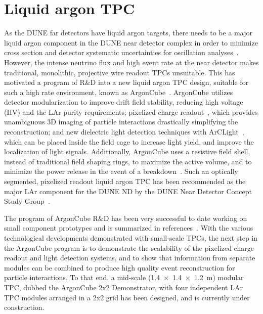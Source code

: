\section{Liquid argon TPC}
\label{sec:exsum-nd-lartpc}


As the DUNE far detectors have liquid argon targets, there needs to be a major liquid argon component in the DUNE near detector complex in order to minimize cross section and detector systematic uncertainties for oscillation analyses~\cite{Acciarri:2016crz, Acciarri:2015uup}. However, the intense neutrino flux and high event rate at the near detector makes traditional, monolithic, projective wire readout TPCs unsuitable.  This has motivated a program of R\&D into a new liquid argon TPC design, suitable for such a high rate environment, known as ArgonCube~\cite{argoncube_loi}. ArgonCube utilizes detector modularization to improve drift field stability, reducing high voltage (HV) and the LAr purity requirements; pixelized charge readout~\cite{Asaadi:2018oxk, larpix}, which provides unambiguous 3D imaging of particle interactions drastically simplifying the reconstruction; and new dielectric light detection techniques with ArCLight~\cite{Auger:2017flc}, which can be placed inside the field cage to increase light yield, and improve the localization of light signals. Additionally, ArgonCube uses a resistive field shell, instead of traditional field shaping rings, to maximize the active volume, and to minimize the power release in the event of a breakdown~\cite{argoncube_fd}. Such an optically segmented, pixelized readout liquid argon TPC has been recommended as the major LAr component for the DUNE ND by the DUNE Near Detector Concept Study Group~\cite{dune_ndcsg}.  

The program of ArgonCube R\&D has been very successful to date working on small component prototypes and is summarized in references~\cite{ argontube_design, Zeller:2013sva, art_cold_ero, Asaadi:2018oxk, Cavanna:2014iqa, larpix, argoncube_fd, Auger:2017flc}. 
With the various technological developments demonstrated with small-scale TPCs, the next step in the ArgonCube program is to demonstrate the scalability of the pixelized charge readout and light detection systems, and to show that information from separate modules can be combined to produce high quality event reconstruction for particle interactions. To that end, a mid-scale (\SI[product-units=repeat]{1.4x1.4x1.2}{\metre}) modular TPC, dubbed the ArgonCube 2x2 Demonstrator, with four independent LAr TPC modules arranged in a 2x2 grid has been designed, and is currently under construction. 

